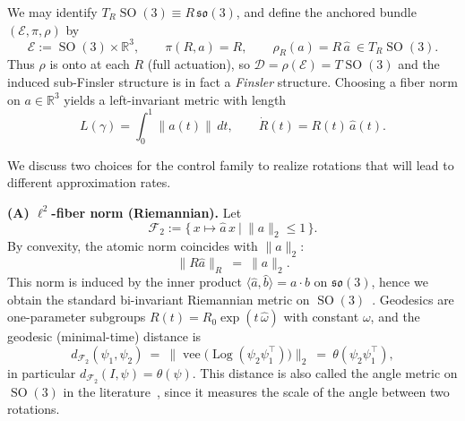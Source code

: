 \documentclass[12pt]{amsart}
\numberwithin{equation}{section}
\theoremstyle{remark}
\begin{document}
We may identify \(T_R\operatorname{SO}(3) \equiv R\,\mathfrak{so}(3)\),
and define the anchored bundle \((\mathcal E,\pi,\rho)\) by
\begin{equation}
\mathcal E:=\operatorname{SO}(3)\times \mathbb R^3,\qquad
\pi(R,a)=R,\qquad
\rho_R(a)=R\,\hat a\ \in T_R\operatorname{SO}(3).
\end{equation}
Thus \(\rho\) is onto at each \(R\) (full actuation), so \(\mathcal D=\rho(\mathcal E)=T\operatorname{SO}(3)\) and the induced sub-Finsler structure is in fact a \emph{Finsler} structure.
Choosing a fiber norm on \(a\in\mathbb R^3\) yields a left-invariant metric with length
\begin{equation}
L(\gamma)=\int_0^1 \|a(t)\|\,dt,\qquad \dot R(t)=R(t)\,\hat{a}(t).
\end{equation}

We discuss two choices for the control family to realize rotations that will lead
to different approximation rates.

\medskip
\noindent\textbf{(A) \(\ell^2\)-fiber norm (Riemannian).}
Let
\begin{equation}
\mathcal F_2:=\big\{\,x\mapsto \hat a\,x\ \big|\ \|a\|_2\le 1\,\big\}.
\end{equation}
By convexity, the atomic norm coincides with \(\|a\|_2\):
\begin{equation}
\|R\hat a\|_{R}\ =\ \|a\|_2.
\end{equation}
This norm is induced by the inner product
\(\langle \hat a,\hat b\rangle=a\cdot b\) on \(\mathfrak{so}(3)\), hence we obtain the standard bi-invariant Riemannian metric on \(\operatorname{SO}(3)\)~\cite{huynh2009metrics}.
Geodesics are one-parameter subgroups \(R(t)=R_0\exp(t\,\hat \omega)\) with constant \(\omega\), and the geodesic (minimal-time) distance is
\begin{equation}
\label{eq:l2_equals_angle}
d_{\mathcal F_2}(\psi_1,\psi_2)\ =\ \big\|\operatorname{vee}\big(\operatorname{Log}(\psi_2\psi_1^{\top})\big)\big\|_2
\ =\ \theta(\psi_2\psi_1^\top),
\end{equation}
in particular \(d_{\mathcal F_2}(I,\psi)=\theta(\psi)\).
This distance is also called the angle metric on \(\operatorname{SO}(3)\) in the literature~\cite{hartley2013rotation}, since it measures the scale of the angle between two rotations.
\end{document}
